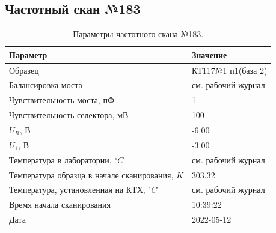 \subsection{Частотный скан №183}
\begin{table}[!ht]
    \centering
    \caption{Параметры частотного скана №183.}
    \begin{tabular}{|l|l|}
        \hline
        Параметр                                       & Значение                  \\ \hline
        Образец                                        & КТ117№1 п1(база 2)        \\ \hline
        Балансировка моста                             & см. рабочий журнал        \\ \hline
        Чувствительность моста, пФ                     & 1                         \\ \hline
        Чувствительность селектора, мВ                 & 100                       \\ \hline
        $U_R$, В                                       & -6.00                     \\ \hline
        $U_1$, В                                       & -3.00                     \\ \hline
        Температура в лаборатории, $^\circ C$          & см. рабочий журнал        \\ \hline
        Температура образца в начале сканирования, $K$ & 303.32                    \\ \hline
        Температура, установленная на КТХ, $^\circ C$  & см. рабочий журнал        \\ \hline
        Время начала сканирования                      & 10:39:22                  \\ \hline
        Дата                                           & 2022-05-12                \\ \hline
    \end{tabular}
    \label{table:frequency_scan_183}
\end{table}

